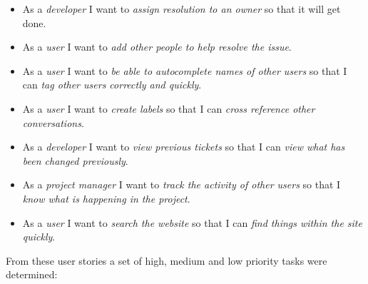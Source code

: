 \documentclass[a4paper]{l3proj}
\begin{document}
\begin{itemize}
  \item As a \textit{developer} I want to \textit{assign resolution to an owner} so that it will get done.
  \item As a \textit{user} I want to \textit{add other people to help resolve the issue}.
  \item As a \textit{user} I want to \textit{be able to autocomplete names of other users} so that I can \textit{tag other users correctly and quickly}.
  \item As a \textit{user} I want to \textit{create labels} so that I can \textit{cross reference other conversations}.
  \item As a \textit{developer} I want to \textit{view previous tickets} so that I can \textit{view what has been changed previously}.
  \item As a \textit{project manager} I want to \textit{track the activity of other users} so that I \textit{know what is happening in the project}.
  \item As a \textit{user} I want to \textit{search the website} so that I can \textit{find things within the site quickly}.
  \end{itemize}

  From these user stories a set of high, medium and low priority tasks were determined:
\end{document}
